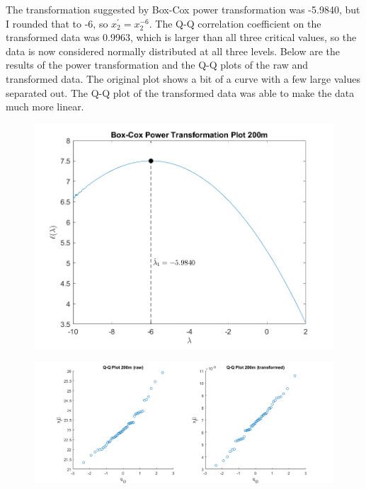 The transformation suggested by Box-Cox power transformation was -5.9840, but I rounded that to -6, so $x_{2}^{\prime} = x_{2}^{-6}$.
The Q-Q correlation coefficient on the transformed data was 0.9963, which is larger than all three critical values, so the data is now considered normally distributed at all three levels.
Below are the results of the power transformation and the Q-Q plots of the raw and transformed data.
The original plot shows a bit of a curve with a few large values separated out. The Q-Q plot of the transformed data was able to make the data much more linear.

\begin{center}
    \begin{figure}[H]
        \centering
        \includegraphics[scale=0.6]{./matlab/chapter-4/sol4.36.power.2.png}
    \end{figure}
\end{center}

\begin{center}
    \begin{figure}[H]
        \centering
        \includegraphics[scale=0.4]{./matlab/chapter-4/sol4.36.qq.2.png}
    \end{figure}
\end{center}

